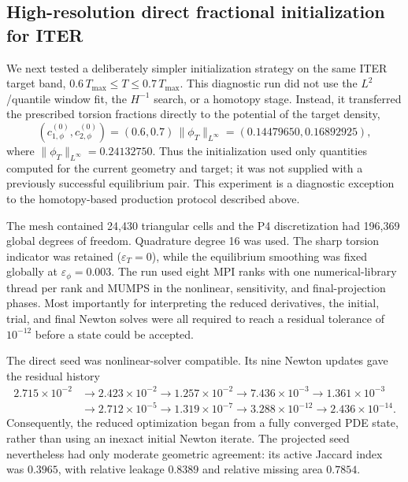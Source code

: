 \subsection{High-resolution direct fractional initialization for ITER}
\label{sec:iter-fractional-highdof}
We next tested a deliberately simpler initialization strategy on the same
ITER target band,
$0.6\,T_{\max}\leq T\leq0.7\,T_{\max}$. This diagnostic run did not use the
$L^2$/quantile window fit, the $H^{-1}$ search, or a homotopy stage. Instead,
it transferred the prescribed torsion fractions directly to the potential of
the target density,
\[
  (c_{1,\phi}^{(0)},c_{2,\phi}^{(0)})
  =(0.6,0.7)\,\|\phi_T\|_{L^\infty}
  =(0.14479650,0.16892925),
\]
where $\|\phi_T\|_{L^\infty}=0.24132750$. Thus the initialization used only
quantities computed for the current geometry and target; it was not supplied
with a previously successful equilibrium pair. This experiment is a
diagnostic exception to the homotopy-based production protocol described
above.

The mesh contained 24,430 triangular cells and the P4 discretization had
196,369 global degrees of freedom. Quadrature degree 16 was used. The sharp
torsion indicator was retained ($\varepsilon_T=0$), while the equilibrium
smoothing was fixed globally at $\varepsilon_\phi=0.003$. The run used eight
MPI ranks with one numerical-library thread per rank and MUMPS in the
nonlinear, sensitivity, and final-projection phases. Most importantly for
interpreting the reduced derivatives, the initial, trial, and final Newton
solves were all required to reach a residual tolerance of $10^{-12}$ before a
state could be accepted.

The direct seed was nonlinear-solver compatible. Its nine Newton updates gave
the residual history
\[
\begin{aligned}
  2.715\!\times\!10^{-2}&\to2.423\!\times\!10^{-2}
  \to1.257\!\times\!10^{-2}\to7.436\!\times\!10^{-3}
  \to1.361\!\times\!10^{-3}\\
  &\to2.712\!\times\!10^{-5}\to1.319\!\times\!10^{-7}
  \to3.288\!\times\!10^{-12}\to2.436\!\times\!10^{-14}.
\end{aligned}
\]
Consequently, the reduced optimization began from a fully converged PDE
state, rather than using an inexact initial Newton iterate. The projected
seed nevertheless had only moderate geometric agreement: its active Jaccard
index was $0.3965$, with relative leakage $0.8389$ and relative missing area
$0.7854$.

